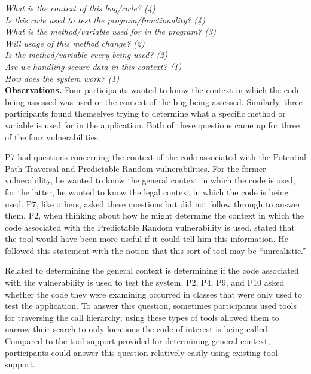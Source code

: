 \documentclass[conference]{IEEEtran}
\begin{document}
\noindent\emph{What is the context of this bug/code? (4)} \\
\emph{Is this code used to test the program/functionality? (4)} \\
\emph{What is the method/variable used for in the program? (3)} \\
\emph{Will usage of this method change? (2)} \\
\emph{Is the method/variable every being used? (2)} \\
\emph{Are we handling secure data in this context? (1)} \\
\emph{How does the system work? (1)} \\



\noindent\textbf{Observations.}
Four participants wanted to know the context in which the code being assessed was used or the context of the bug being assessed.
Similarly, three participants found themselves trying to determine what a specific method or variable is used for in the application.
Both of these questions came up for three of the four vulnerabilities.

 
P7 had questions concerning the context of the code associated with the Potential Path Traversal and Predictable Random vulnerabilities.
For the former vulnerability, he wanted to know the general context in which the code is used; for the latter, he wanted to know the legal context in which the code is being used.
P7, like others, asked these questions but did not follow through to answer them. 
P2, when thinking about how he might determine the context in which the code associated with the Predictable Random vulnerability is used, stated that the tool would have been more useful if it could tell him this information.
He followed this statement with the notion that this sort of tool may be ``unrealistic.'' 


Related to determining the general context is determining if the code associated with the vulnerability is used to test the system. 
P2, P4, P9, and P10 asked whether the code they were examining occurred in classes that were only used to test the application. 
To answer this question, sometimes participants used tools for traversing the call hierarchy; using these types of tools allowed them to narrow their search to only locations the code of interest is being called.
Compared to the tool support provided for determining general context, participants could answer this question relatively easily using existing tool support.
\\
\end{document}
